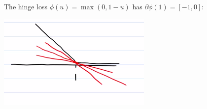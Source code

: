\documentclass[11pt]{scrartcl}
\begin{document}

\begin{example}
The hinge loss $\phi(u) = \max(0,1-u)$ has $\partial \phi(1) = [-1,0]$:

\begin{center}
\includegraphics[scale=0.5]{hinge subdiff.png}
\label{hinge subdiffs}
\end{center}
\end{example}
\end{document}
